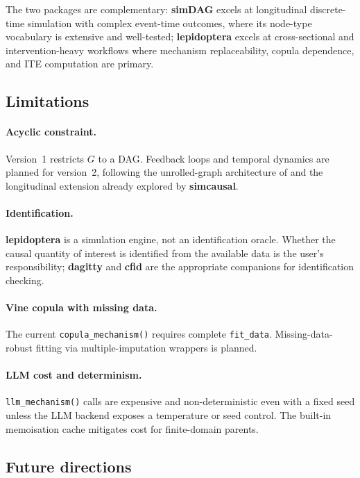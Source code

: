 \documentclass[12pt,a4paper]{article}
\newcommand{\pkg}[1]{\textbf{#1}}
\newcommand{\code}[1]{\texttt{#1}}
\newcommand{\fct}[1]{\mbox{\texttt{#1()}}}
\begin{document}
The two packages are complementary: \pkg{simDAG} excels at longitudinal
discrete-time simulation with complex event-time outcomes, where its node-type
vocabulary is extensive and well-tested; \pkg{lepidoptera} excels at
cross-sectional and intervention-heavy workflows where mechanism replaceability,
copula dependence, and ITE computation are primary.

\subsection{Limitations}

\paragraph{Acyclic constraint.} Version~1 restricts $G$ to a DAG. Feedback loops
and temporal dynamics are planned for version~2, following the unrolled-graph
architecture of \citet{bongers2021foundations} and the longitudinal extension
already explored by \pkg{simcausal}.

\paragraph{Identification.} \pkg{lepidoptera} is a simulation engine, not an
identification oracle. Whether the causal quantity of interest is identified from
the available data is the user's responsibility; \pkg{dagitty} \citep{textor2016dagitty}
and \pkg{cfid} \citep{tikka2022cfid} are the appropriate companions for
identification checking.

\paragraph{Vine copula with missing data.} The current \fct{copula\_mechanism}
requires complete \code{fit\_data}. Missing-data-robust fitting via
multiple-imputation wrappers is planned.

\paragraph{LLM cost and determinism.} \fct{llm\_mechanism} calls are expensive
and non-deterministic even with a fixed seed unless the LLM backend exposes a
temperature or seed control. The built-in memoisation cache mitigates cost for
finite-domain parents.

\subsection{Future directions}
\end{document}
